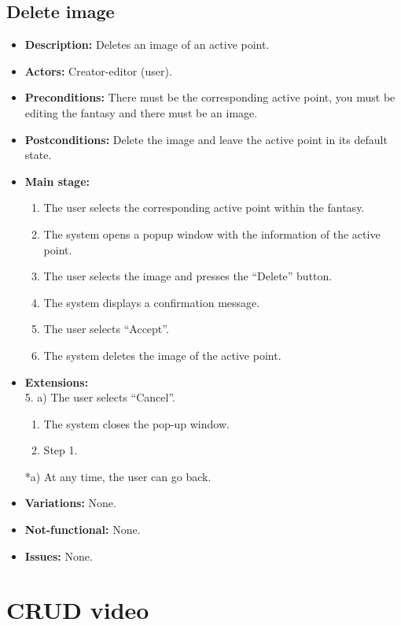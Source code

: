 \subsection{Delete image}
\begin{itemize}
	\item \textbf{Description:} Deletes an image of an active point.
	\item \textbf{Actors:} Creator-editor (user).
	\item \textbf{Preconditions:} There must be the corresponding active point, you must be editing the fantasy and there must be an image.
	\item \textbf{Postconditions:} Delete the image and leave the active point in its default state.
	\item \textbf{Main stage:}
	\begin{enumerate}
		\item The user selects the corresponding active point within the fantasy.
		\item The system opens a popup window with the information of the active point.
		\item The user selects the image and presses the ``Delete'' button.
		\item The system displays a confirmation message.
		\item The user selects ``Accept''.
		\item The system deletes the image of the active point.
	\end{enumerate}
	\item \textbf{Extensions:} \\ 5. a) The user selects ``Cancel''.
	\begin{enumerate}
		\item The system closes the pop-up window.
		\item Step 1.
	\end{enumerate}
	*a) At any time, the user can go back.
	\item \textbf{Variations:} None.
	\item \textbf{Not-functional:} None.
	\item \textbf{Issues:} None.
\end{itemize}

\section{CRUD video}
\hypertarget{crearvideo}{}
